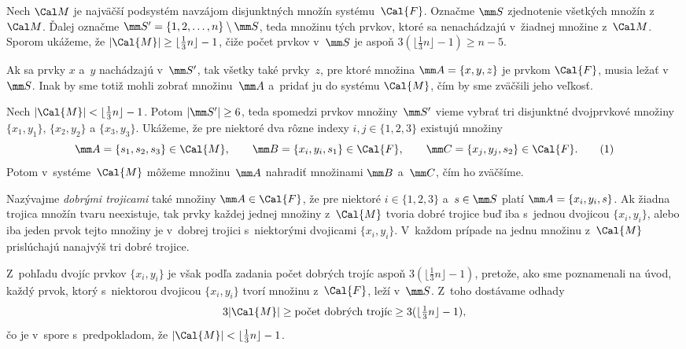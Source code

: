 {%
 Nech $\Cal M$ je najväčší podsystém navzájom disjunktných množín systému~$\Cal{F}$. Označme $\mm S$ zjednotenie všetkých množín z~$\Cal M$. Ďalej označme ${\mm S'=\{1,2,\dots,n\}\setminus\mm S}$, teda množinu tých prvkov, ktoré sa nenachádzajú v~žiadnej množine z~$\Cal M$.
Sporom ukážeme, že $|\Cal{M}| \ge \lfloor\frac13n\rfloor - 1$, čiže počet prvkov v~$\mm S$ je aspoň ${3(\lfloor\frac13n\rfloor - 1)} \ge n-5$.

Ak sa prvky $x$ a~$y$ nachádzajú v~$\mm S'$, tak všetky také prvky~$z$, pre ktoré množina $\mm A=\{x,y,z\}$ je prvkom $\Cal{F}$, musia ležať v~$\mm S$. Inak by sme totiž mohli zobrať množinu~$\mm A$ a~pridať ju do systému $\Cal{M}$, čím by sme zväčšili jeho veľkosť.

Nech $|\Cal{M}| < \lfloor\frac13n\rfloor - 1$. Potom $|\mm S'|\ge 6$, teda spomedzi prvkov množiny~$\mm S'$ vieme vybrať tri disjunktné dvojprvkové množiny $\{x_1, y_1\}$, $\{x_2, y_2\}$ a $\{x_3,y_3\}$.
Ukážeme, že pre niektoré dva rôzne indexy $i,j\in\{1,2,3\}$ existujú množiny
$$
\mm A=\{s_1, s_2, s_3\}\in \Cal{M},\qquad \mm B=\{x_i,y_i,s_1\}\in\Cal{F},\qquad \mm C=\{x_j,y_j,s_2\}\in\Cal{F}.
\tag1
$$
Potom v~systéme~$\Cal{M}$ môžeme množinu~$\mm A$ nahradiť množinami $\mm B$ a~$\mm C$, čím ho zväčšíme.

Nazývajme {\it dobrými trojicami\/} také množiny $\mm A\in\Cal{F}$, že pre niektoré $i\in\{1,2,3\}$ a~$s\in\mm S$ platí $\mm A=\{x_i,y_i,s\}$.
Ak žiadna trojica množín tvaru  neexistuje, tak prvky každej jednej množiny z~$\Cal{M}$ tvoria dobré trojice buď iba s~jednou dvojicou $\{x_i, y_i\}$, alebo iba jeden prvok tejto množiny je v~dobrej trojici s~niektorými dvojicami $\{x_i, y_i\}$.
V~každom prípade na jednu množinu z~$\Cal{M}$ prislúchajú nanajvýš tri dobré trojice.

Z~pohľadu dvojíc prvkov $\{x_i, y_i\}$ je však podľa zadania počet dobrých trojíc aspoň $3(\lfloor\frac13n\rfloor - 1)$, pretože, ako sme poznamenali na úvod, každý prvok, ktorý s~niektorou dvojicou $\{x_i, y_i\}$ tvorí množinu z~$\Cal{F}$, leží v~$\mm S$.
Z~toho dostávame odhady
$$
3|\Cal{M}|\ge \text{počet dobrých trojíc}\ge 3(\lfloor\tfrac13n\rfloor - 1),
$$
čo je v~spore s~predpokladom, že $|\Cal{M}| < \lfloor\frac13n\rfloor - 1$.}

